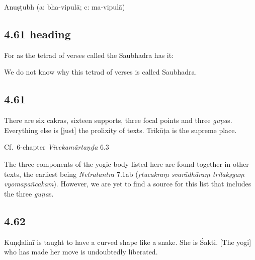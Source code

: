 \begin{ekdosis}
\begin{metre}[hp04_060]
Anuṣṭubh (a: bha-vipulā; c: ma-vipulā)
\end{metre}

\subsection*{4.61 heading}
\begin{translation}[hp04_061a]
For as the tetrad of verses called the Saubhadra has it:
\end{translation}

\begin{philcomm}[hp04_061a]
We do not know why this tetrad of verses is called Saubhadra.
\end{philcomm}

\subsection*{4.61}
\begin{translation}[hp04_061]
There are six cakras, sixteen supports, three focal points and three \emph{guṇa}s. Everything else is [just] the prolixity of texts. Trikūṭa is the supreme place.
\end{translation}


\begin{testimonia}[hp04_061]
Cf.~6-chapter \emph{Vivekamārtaṇḍa} 6.3
\begin{versinnote}
\end{versinnote}
\end{testimonia}

\begin{philcomm}[hp04_061]
The three components of the yogic body listed here are found together in other texts, the earliest being \emph{Netratantra} 7.1ab (\emph{ṛtucakraṃ svarādhāraṃ trilakṣyaṃ vyomapañcakam}). However, we are yet to find a source for this list that includes the three \emph{guṇa}s.
\end{philcomm}

\subsection*{4.62}
\begin{translation}[hp04_062]
Kuṇḍalinī is taught to have a curved shape like a snake. She is Śakti. [The yogi] who has made her move is undoubtedly liberated.
\end{translation}


\end{ekdosis}
